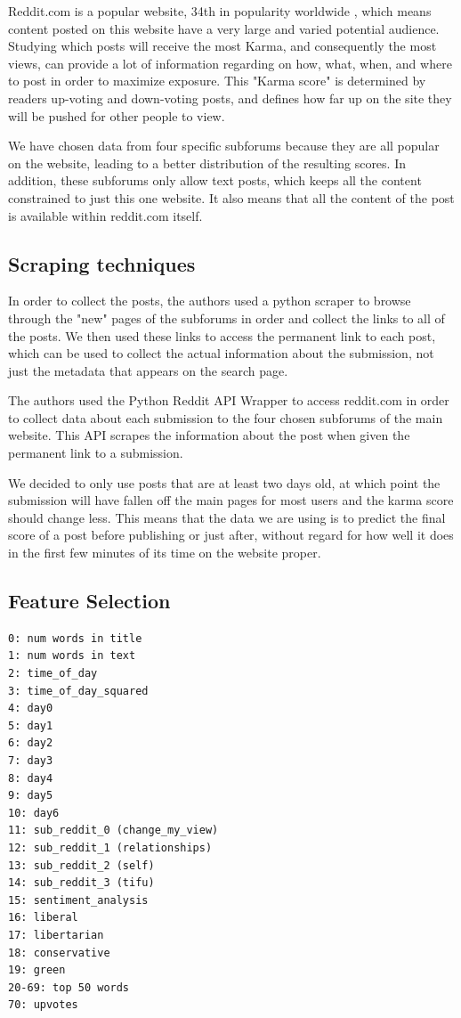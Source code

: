 \documentclass[10pt,twocolumn]{article}
\begin{document}
Reddit.com is a popular website, 34th in popularity worldwide \cite{alexa}, which means content posted on this website have a very large and varied potential audience.
Studying which posts will receive the most Karma, and consequently the most views, can provide a lot of information regarding on how, what, when, and where to post in order to maximize exposure.
This "Karma score" is determined by readers up-voting and down-voting posts, and defines how far up on the site they will be pushed for other people to view.

We have chosen data from four specific subforums because they are all popular on the website, leading to a better distribution of the resulting scores. In addition, these subforums only allow text posts, which keeps all the content constrained to just this one website. It also means that all the content of the post is available within reddit.com itself.

\subsection{Scraping techniques}
In order to collect the posts, the authors used a python scraper to browse through the "new" pages of the subforums in order and collect the links to all of the posts. We then used these links to access the permanent link to each post, which can be used to collect the actual information about the submission, not just the metadata that appears on the search page.

The authors used the Python Reddit API Wrapper \cite{praw} to access reddit.com in order to collect data about each submission to the four chosen subforums of the main website. This API scrapes the information about the post when given the permanent link to a submission.

We decided to only use posts that are at least two days old, at which point the submission will have fallen off the main pages for most users and the karma score should change less. This means that the data we are using is to predict the final score of a post before publishing or just after, without regard for how well it does in the first few minutes of its time on the website proper.

\subsection{Feature Selection}
\begin{verbatim}
0: num words in title
1: num words in text
2: time_of_day
3: time_of_day_squared
4: day0
5: day1
6: day2
7: day3
8: day4
9: day5
10: day6
11: sub_reddit_0 (change_my_view)
12: sub_reddit_1 (relationships)
13: sub_reddit_2 (self)
14: sub_reddit_3 (tifu)
15: sentiment_analysis
16: liberal
17: libertarian
18: conservative
19: green
20-69: top 50 words
70: upvotes
\end{verbatim}
\end{document}
